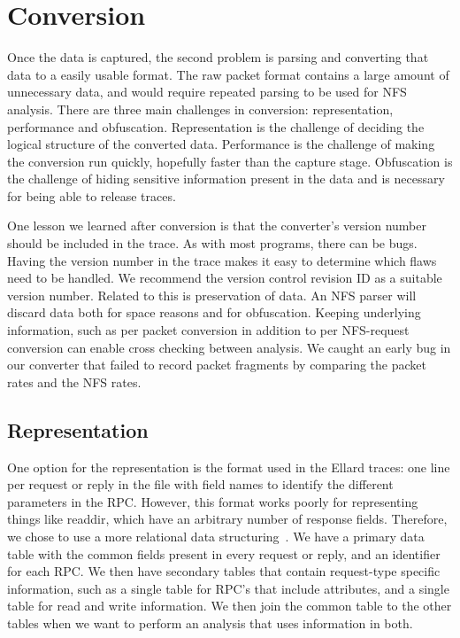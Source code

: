 \section{Conversion}
\label{sec:conversion}

Once the data is captured, the second problem is parsing and
converting that data to a easily usable format.  The raw packet format
contains a large amount of unnecessary data, and would require
repeated parsing to be used for NFS analysis.  There are three main
challenges in conversion: representation, performance and obfuscation.
Representation is the challenge of deciding the logical structure of
the converted data.  Performance is the challenge of making the
conversion run quickly, hopefully faster than the capture stage.
Obfuscation is the challenge of hiding sensitive information present
in the data and is necessary for being able to release traces.

One lesson we learned after conversion is that the converter's version
number should be included in the trace.  As with most programs, there
can be bugs.  Having the version number in the trace makes it easy to
determine which flaws need to be handled.  We recommend the version
control revision ID as a suitable version number.  Related to this is
preservation of data.  An NFS parser will discard data both for space
reasons and for obfuscation.  Keeping underlying information, such as
per packet conversion in addition to per NFS-request conversion can
enable cross checking between analysis.  We caught an early bug in our
converter that failed to record packet fragments by comparing the
packet rates and the NFS rates.  

\subsection{Representation}

One option for the representation is the format used in the
Ellard\cite{ellardTraces} traces: one line per request or reply in the
file with field names to identify the different parameters in the RPC.
However, this format works poorly for representing things like
readdir, which have an arbitrary number of response fields.
Therefore, we chose to use a more relational data
structuring~\cite{codd70relational}.  We have a primary data table
with the common fields present in every request or reply, and an
identifier for each RPC.  We then have secondary tables that contain
request-type specific information, such as a single table for RPC's
that include attributes, and a single table for read and write
information.  We then join the common table to the other tables when
we want to perform an analysis that uses information in both.


